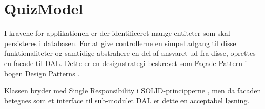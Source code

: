 \section{QuizModel}

I kravene for applikationen er der identificeret mange entiteter som skal persisteres i databasen. For at give controllerne en  simpel adgang til disse funktionaliteter og samtidige abstrahere en del af ansvaret ud fra disse, oprettes en facade til DAL. Dette er en designstrategi beskrevet som Fa\c{c}ade Pattern i bogen Design Patterns \citep[s. 185-193]{gof}.

Klassen bryder med Single Responsibility i SOLID-principperne \citep{wikiSolid}, men da facaden betegnes som et interface til sub-modulet DAL er dette en acceptabel løsning.
